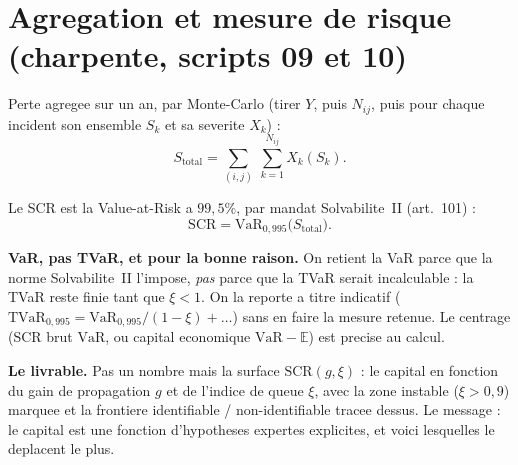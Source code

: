 \documentclass[11pt,a4paper]{article}
\newcommand{\E}{\mathbb{E}}
\newcommand{\VaR}{\mathrm{VaR}}
\newcommand{\TVaR}{\mathrm{TVaR}}
\begin{document}
\section{Agregation et mesure de risque (charpente, scripts 09 et 10)}

Perte agregee sur un an, par Monte-Carlo (tirer $Y$, puis $N_{ij}$, puis pour chaque
incident son ensemble $S_k$ et sa severite $X_k$) :
\begin{equation}
S_{\text{total}}=\sum_{(i,j)}\ \sum_{k=1}^{N_{ij}} X_k(S_k).
\end{equation}

Le SCR est la Value-at-Risk a $99{,}5\%$, par mandat Solvabilite~II (art.~101) :
\begin{equation}
\mathrm{SCR}=\VaR_{0{,}995}\big(S_{\text{total}}\big).
\end{equation}

\begin{attention}
\textbf{VaR, pas TVaR, et pour la bonne raison.} On retient la VaR parce que la norme
Solvabilite~II l'impose, \emph{pas} parce que la TVaR serait incalculable : la TVaR
reste finie tant que $\xi<1$. On la reporte a titre indicatif
($\TVaR_{0{,}995}=\VaR_{0{,}995}/(1-\xi)+\dots$) sans en faire la mesure retenue.
Le centrage (SCR brut $\VaR$, ou capital economique $\VaR-\E$) est precise au calcul.
\end{attention}

\begin{apport}
\textbf{Le livrable.} Pas un nombre mais la surface $\mathrm{SCR}(g,\xi)$ : le capital
en fonction du gain de propagation $g$ et de l'indice de queue $\xi$, avec la zone
instable ($\xi>0{,}9$) marquee et la frontiere identifiable / non-identifiable tracee
dessus. Le message : le capital est une fonction d'hypotheses expertes explicites, et
voici lesquelles le deplacent le plus.
\end{apport}
\end{document}
